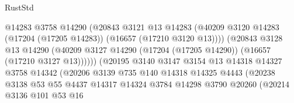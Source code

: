 \begin{lexlean}{RustStd}
\begin{coremodule}
                                        @14283
                                        @3758
                                        @14290
                                        (@20843
                                          @3121
                                          @13
                                          @14283
                                          (@40209
                                            @3120
                                            @14283
                                            (@17204 (@17205 @14283))
                                            (@16657 (@17210 @3120 @13))))
                                        (@20843
                                          @3128
                                          @13
                                          @14290
                                          (@40209
                                            @3127
                                            @14290
                                            (@17204 (@17205 @14290))
                                            (@16657 (@17210 @3127 @13))))))
                                    (@20195
                                      @3140
                                      @3147
                                      @3154
                                      @13
                                      @14318
                                      @14327
                                      @3758
                                      @14342
                                      (@20206
                                        @3139
                                        @735
                                        @140
                                        @14318
                                        @14325
                                        @4443
                                        (@20238
                                          @3138
                                          @53
                                          @55
                                          @4437
                                          @14317
                                          @14324
                                          @3784
                                          @14298
                                          @3790
                                          @20260
                                          (@20214
                                            @3136
                                            @101
                                            @53
                                            @16

\end{coremodule}
\end{lexlean}
